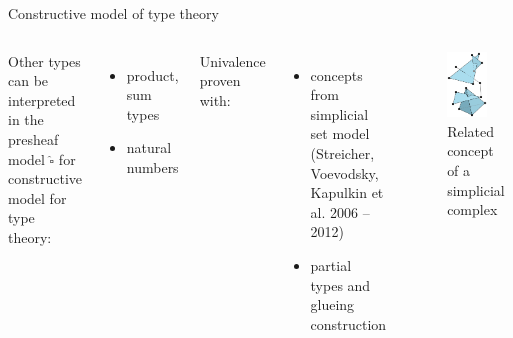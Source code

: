 \documentclass[english, draft]{beamer}
\begin{document}
\begin{frame}{Constructive model of type theory}{}
 


 \begin{columns}[c]
         Other types can be interpreted in the presheaf model  $\widehat{\square}$
          for constructive model for type theory:
 \begin{itemize}
  \item product, sum types
  \item natural numbers
 \end{itemize}
 
        Univalence proven with:
        
       \begin{itemize}
        \item concepts from simplicial set model (Streicher, Voevodsky, Kapulkin et al. 2006 -- 2012)
        \item partial types and glueing construction 
       \end{itemize}
        \begin{figure}
       \includegraphics[width=0.7\textwidth]{figures/simplex}
       \caption{Related concept of a simplicial complex}
       \end{figure}
\end{columns}
 
\end{frame}
\end{document}
